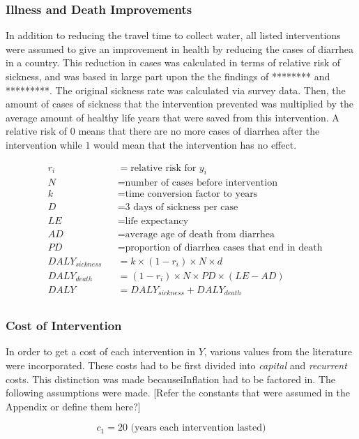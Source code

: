 \subsubsection*{Illness and Death Improvements}
In addition to reducing the travel time to collect water, all listed interventions were assumed to give an improvement in health by reducing the cases of diarrhea in a country. 
This reduction in cases was calculated in terms of relative risk of sickness, and was based in large part upon the the findings of ******** and *********.
The original sickness rate was calculated via survey data.
Then, the amount of cases of sickness that the intervention prevented was multiplied by the average amount of healthy life years that were saved from this intervention. A relative risk of $0$ means that there are no more cases of diarrhea after the intervention while $1$ would mean that the intervention has no effect.

\begin{equation*}
\begin{aligned}
& r_i 
& & = \text{relative risk for } y_i \\
& N
& & = \text{number of cases before intervention} \\
& k 
& & = \text{time conversion factor to years} \\
& D 
& & = \text{3 days of sickness per case} \\
& LE 
& & = \text{life expectancy} \\
& AD 
& & = \text{average age of death from diarrhea} \\
& PD 
& & = \text{proportion of diarrhea cases that end in death} \\
& DALY_{sickness} 
& & = k \times (1-r_i) \times N \times d \\
& DALY_{death} 
& & = (1-r_i)\times N \times PD \times (LE - AD) \\
& DALY
& & = DALY_{sickness} + DALY_{death} \\
\end{aligned}
\end{equation*}

\subsubsection*{Cost of Intervention}
In order to get a cost of each intervention in $Y$, various values from the literature were incorporated.
These costs had to be first divided into \emph{capital} and \emph{recurrent} costs.
This distinction was made becauseiInflation had to be factored in.
The following assumptions were made.
[Refer the constants that were assumed in the Appendix or define them here?]

$$c_1 = 20 \text{ (years each intervention lasted)}$$
